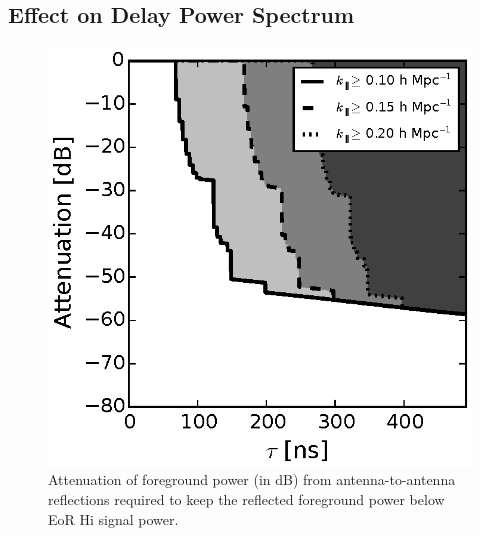 \documentclass[preprint2,iop,numberedappendix,twocolappendix,appendixfloats]{emulateapj}
\begin{document}

\subsection{Effect on Delay Power Spectrum}\label{sec:chromaticity-delay-spectrum}

\begin{figure}[htb]
\centering
\includegraphics[width=\linewidth]{spec_on_achrmbeam_foreground_reflected_power_21cmfast_14.6m_150.0_MHz_subband_v2.eps}
\caption{Attenuation of foreground power (in dB) from antenna-to-antenna reflections required to keep the reflected foreground power below EoR H{\sc i} signal power.}
\label{fig:fg-reflections-achrmbeam}
\end{figure}
\end{document}
